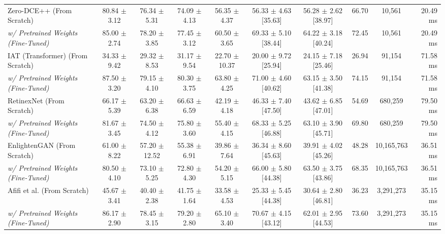 \documentclass[final,5p,times,twocolumn,authoryear]{elsarticle}
\begin{document}
\begin{table}[t]
{\begin{tabular}{lccccccccr}
Zero-DCE++ (From Scratch) \cite{Li2021} & 80.84 $\pm$ 3.12 & 76.34 $\pm$ 5.31 & 74.09 $\pm$ 4.13 & 56.35 $\pm$ 4.37 & 56.33 $\pm$ 4.63 \scriptsize{[35.63]} & 56.28 $\pm$ 2.62 \scriptsize{[38.97]} & 66.70 & 10,561 & 20.49 ms \\
\quad \textit{w/ Pretrained Weights (Fine-Tuned)} & 85.00 $\pm$ 2.74 & 78.20 $\pm$ 3.85 & 77.45 $\pm$ 3.12 & 60.50 $\pm$ 3.65 & 69.33 $\pm$ 5.10 \scriptsize{[38.44]} & 64.22 $\pm$ 3.18 \scriptsize{[40.24]} & 72.45 & 10,561 & 20.49 ms \\
IAT (Transformer) (From Scratch) \cite{Cui2022} & 34.33 $\pm$ 9.42 & 29.32 $\pm$ 8.53 & 31.17 $\pm$ 9.54 & 22.70 $\pm$ 10.37 & 20.00 $\pm$ 9.72 \scriptsize{[25.94]} & 24.15 $\pm$ 7.18 \scriptsize{[25.46]} & 26.94 & 91,154 & 71.58 ms \\
\quad \textit{w/ Pretrained Weights (Fine-Tuned)} & 87.50 $\pm$ 3.20 & 79.15 $\pm$ 4.10 & 80.30 $\pm$ 3.75 & 63.80 $\pm$ 4.25 & 71.00 $\pm$ 4.60 \scriptsize{[40.62]} & 63.15 $\pm$ 3.50 \scriptsize{[41.38]} & 74.15 & 91,154 & 71.58 ms \\
RetinexNet (From Scratch) \cite{Wei2018} & 66.17 $\pm$ 5.39 & 63.20 $\pm$ 6.38 & 66.63 $\pm$ 6.59 & 42.19 $\pm$ 4.18 & 46.33 $\pm$ 7.40 \scriptsize{[47.50]} & 43.62 $\pm$ 6.85 \scriptsize{[47.01]} & 54.69 & 680,259 & 79.50 ms \\
\quad \textit{w/ Pretrained Weights (Fine-Tuned)} & 81.67 $\pm$ 3.45 & 74.50 $\pm$ 4.12 & 75.80 $\pm$ 3.60 & 55.40 $\pm$ 4.15 & 68.33 $\pm$ 5.25 \scriptsize{[46.88]} & 63.10 $\pm$ 3.90 \scriptsize{[45.71]} & 69.80 & 680,259 & 79.50 ms \\
EnlightenGAN (From Scratch) \cite{Jiang2021} & 61.00 $\pm$ 8.22 & 57.20 $\pm$ 12.52 & 55.38 $\pm$ 6.91 & 39.86 $\pm$ 7.64 & 36.34 $\pm$ 8.60 \scriptsize{[45.63]} & 39.91 $\pm$ 4.02 \scriptsize{[45.26]} & 48.28 & 10,165,763 & 36.51 ms \\
\quad \textit{w/ Pretrained Weights (Fine-Tuned)} & 80.50 $\pm$ 4.10 & 73.10 $\pm$ 5.25 & 72.80 $\pm$ 4.30 & 54.20 $\pm$ 5.15 & 66.00 $\pm$ 5.80 \scriptsize{[44.38]} & 63.50 $\pm$ 3.75 \scriptsize{[43.86]} & 68.35 & 10,165,763 & 36.51 ms \\
Afifi et al. (From Scratch) \cite{Afifi2021} & 45.67 $\pm$ 3.41 & 40.40 $\pm$ 2.38 & 41.75 $\pm$ 1.64 & 33.58 $\pm$ 4.53 & 25.33 $\pm$ 5.45 \scriptsize{[44.38]} & 30.64 $\pm$ 2.80 \scriptsize{[46.81]} & 36.23 & 3,291,273 & 35.15 ms \\
\quad \textit{w/ Pretrained Weights (Fine-Tuned)} & 86.17 $\pm$ 2.90 & 78.45 $\pm$ 3.15 & 79.20 $\pm$ 2.80 & 65.10 $\pm$ 3.40 & 70.67 $\pm$ 4.15 \scriptsize{[43.12]} & 62.01 $\pm$ 2.95 \scriptsize{[44.53]} & 73.60 & 3,291,273 & 35.15 ms \\

\end{tabular}}
\end{table}
\end{document}
